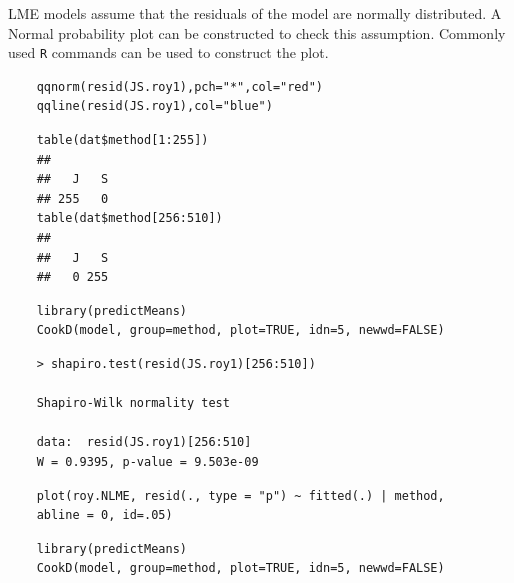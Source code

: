 \documentclass[Main.tex]{subfiles}
\begin{document}
LME models assume that the residuals of the model are normally distributed. A Normal probability plot can be constructed to check this assumption. Commonly used \texttt{R} commands can be used to construct the plot.


\begin{framed}
	\begin{verbatim}
	qqnorm(resid(JS.roy1),pch="*",col="red")
	qqline(resid(JS.roy1),col="blue")
	\end{verbatim}
\end{framed}

\begin{framed}
	\begin{verbatim}
	table(dat$method[1:255])
	## 
	##   J   S 
	## 255   0
	table(dat$method[256:510])
	## 
	##   J   S 
	##   0 255
	\end{verbatim}	
\end{framed}
\begin{framed}
	\begin{verbatim}
	library(predictMeans)
	CookD(model, group=method, plot=TRUE, idn=5, newwd=FALSE)
	\end{verbatim}
\end{framed}






\begin{framed}
	\begin{verbatim}
	> shapiro.test(resid(JS.roy1)[256:510])
	
	Shapiro-Wilk normality test
	
	data:  resid(JS.roy1)[256:510]
	W = 0.9395, p-value = 9.503e-09
	\end{verbatim}
\end{framed}
%		

\begin{framed}
	\begin{verbatim}
	plot(roy.NLME, resid(., type = "p") ~ fitted(.) | method, 
	abline = 0, id=.05)
	\end{verbatim}
\end{framed}

\begin{framed}
	\begin{verbatim}
	library(predictMeans)
	CookD(model, group=method, plot=TRUE, idn=5, newwd=FALSE)
	\end{verbatim}
\end{framed}
\end{document}

